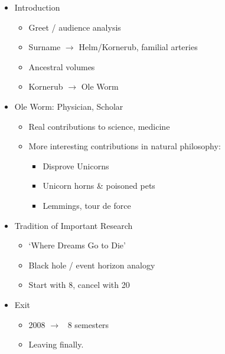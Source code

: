 \documentclass{article}
\begin{document}
  \begin{itemize}
    \item Introduction
      \begin{itemize}
        \item Greet / audience analysis
        \item Surname $\rightarrow$  Helm/Kornerub, familial arteries
        \item Ancestral volumes
        \item Kornerub $\rightarrow$ Ole Worm
      \end{itemize}
      
    \item Ole Worm: Physician, Scholar
      \begin{itemize}
        \item Real contributions to science, medicine
        \item More interesting contributions in natural philosophy:
          \begin{itemize}
            \item Disprove Unicorns
            \item Unicorn horns \& poisoned pets
            \item Lemmings, tour de force
          \end{itemize}
      \end{itemize}
    
    \item Tradition of Important Research
      \begin{itemize}
        \item `Where Dreams Go to Die' 
        \item Black hole / event horizon analogy
        \item Start with 8, cancel with 20
      \end{itemize}
      
    \item Exit
      \begin{itemize}
        \item 2008 $\rightarrow$ ~8 semesters
        \item Leaving finally. 
      \end{itemize}
      
  \end{itemize}
\end{document}

